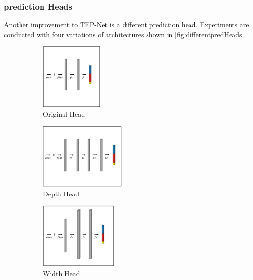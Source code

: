 \subsubsection{prediction Heads}

Another improvement to \ac{TEP}-Net \cite{tepNet2024} is a different prediction head.
Experiments are conducted with four variations of architectures shown in \autoref{fig:differentpredHeads}.

\begin{figure}[H]
    \centering
    \begin{subfigure}[t]{0.21\textwidth}
        \centering
        \includegraphics[height=3.3cm, keepaspectratio]{PICs/improvedModel/originalHead.jpg}
        \caption{Original Head \cite{tepNet2024}}
        \label{fig:predHeadOriginal}
    \end{subfigure}
    \begin{subfigure}[t]{0.27\textwidth}
        \centering
        \includegraphics[height=3.3cm, keepaspectratio]{PICs/improvedModel/depthHead.jpg}
        \caption{Depth Head}
        \label{fig:predHeadDepth}
    \end{subfigure}
    \begin{subfigure}[t]{0.24\textwidth}
        \centering
        \includegraphics[height=3.3cm, keepaspectratio]{PICs/improvedModel/widthHead.jpg}
        \caption{Width Head}
        \label{fig:predHeadWidth}
    \end{subfigure}
    \begin{subfigure}[t]{0.26\textwidth}

\end{subfigure}
\end{figure}
